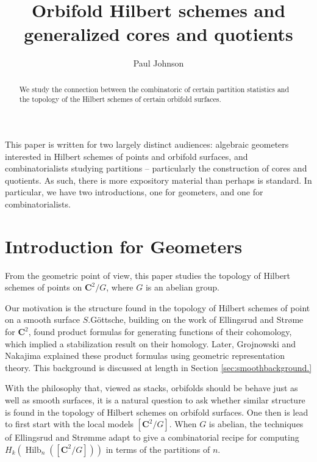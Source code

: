 \documentclass{amsart}[12pt]
\theoremstyle{definition}
\newcommand{\C}{\mathbf{C}}
\DeclareMathOperator{\Hilb}{Hilb}
\begin{document}
\begin{abstract}
We study the connection between the combinatoric of certain partition statistics and the topology of the Hilbert schemes of certain orbifold surfaces.
\end{abstract}


\title{Orbifold Hilbert schemes and generalized cores and quotients}


\author{Paul Johnson}
\address{University of Sheffield}


\maketitle
\setcounter{tocdepth}{1}
\tableofcontents
This paper is written for two largely distinct audiences: algebraic geometers interested in Hilbert schemes of points and orbifold surfaces, and combinatorialists studying partitions -- particularly the construction of cores and quotients.  As such, there is more expository material than perhaps is standard.  In particular, we have two introductions, one for geometers, and one for combinatorialists.


\section{Introduction for Geometers}
From the geometric point of view, this paper studies the topology of Hilbert schemes of points on $\C^2/G$, where $G$ is an abelian group.  

Our motivation is the structure found in the topology of Hilbert schemes of point on a smooth surface $S$.G\"ottsche, building on the work of Ellingsrud and Str\o me for $\C^2$, found product formulas for generating functions of their cohomology, which implied a stabilization result on their homology.  Later, Grojnowski and Nakajima \cite{grojnowski, nakajimaheisenberg} explained these product formulas using geometric representation theory.  This background is discussed at length in Section \ref{sec:smoothbackground.}

With the philosophy that, viewed as stacks, orbifolds should be behave just as well as smooth surfaces, it is a natural question to ask whether similar structure is found in the topology of Hilbert schemes on orbifold surfaces.  One then is lead to first start with the local models $[\C^2/G]$.  When $G$ is abelian, the techniques of Ellingsrud and Str\o mme adapt to give a combinatorial recipe for computing $H_k(\Hilb_n([\C^2/G]))$ in terms of the partitions of $n$.
\end{document}

